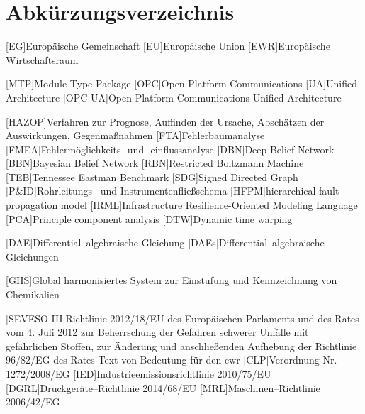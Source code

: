 \chapter*{Abk\"urzungsverzeichnis}
\begin{acronym}[12. BImSchV] %
	[EG]{Europ\"aische Gemeinschaft} %
	[EU]{Europ\"aische Union} %
	[EWR]{Europ\"aische Wirtschaftsraum }
	
  [MTP]{Module Type Package}	
  [OPC]{Open Platform Communications}
  [UA]{Unified Architecture}
  [OPC-UA]{Open Platform Communications Unified Architecture}
	
	[HAZOP]{Verfahren zur Prognose, Auffinden der Ursache, Absch\"atzen der Auswirkungen, Gegenma\ss{}nahmen }
	[FTA]{Fehlerbaumanalyse }
	[FMEA]{Fehlerm\"oglichkeits- und -einflussanalyse }
	[DBN]{Deep Belief Network}
	[BBN]{Bayesian Belief Network}
	[RBN]{Restricted Boltzmann Machine}
	[TEB]{Tennessee Eastman Benchmark}
	[SDG]{Signed Directed Graph}
	[P\&{}ID]{Rohrleitungs-- und Instrumentenflie\ss{}schema }
	[HFPM]{hierarchical fault propagation model}
	[IRML]{Infrastructure Resilience-Oriented Modeling Language}
	[PCA]{Principle component analysis}
	[DTW]{Dynamic time warping}
	
	[DAE]{Differential--algebraische Gleichung }
	[DAEs]{Differential--algebraische Gleichungen }
	
	[GHS]{Global harmonisiertes System zur Einstufung und Kennzeichnung von Chemikalien}
		
	[SEVESO III]{Richtlinie 2012/18/EU des Europ\"aischen Parlaments und des Rates vom 4. Juli 2012 zur Beherrschung der Gefahren schwerer Unf\"alle mit gef\"ahrlichen Stoffen, zur \"Anderung und anschlie\ss{}enden Aufhebung der Richtlinie 96/82/EG des Rates Text von Bedeutung f\"ur den \ac{ewr}}
	[CLP]{Verordnung Nr. 1272/2008/EG}
	[IED]{Industrieemissionsrichtlinie 2010/75/EU}
	[DGRL]{Druckger\"ate--Richtlinie 2014/68/EU}
	[MRL]{Maschinen--Richtlinie 2006/42/EG}
	

\end{acronym}
